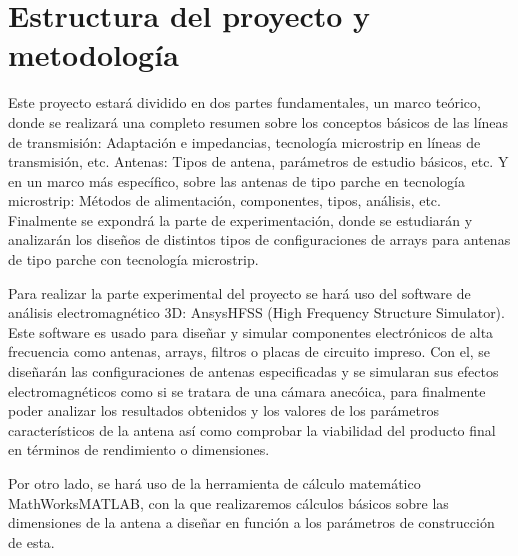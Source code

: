 \section{Estructura del proyecto y metodología}

\par Este proyecto estará dividido en dos partes fundamentales, un marco teórico, donde se realizará una completo resumen sobre los conceptos básicos de las líneas de transmisión: Adaptación e impedancias, tecnología microstrip en líneas de transmisión, etc. Antenas: Tipos de antena, parámetros de estudio básicos, etc. Y en un marco más específico, sobre las antenas de tipo parche en tecnología microstrip: Métodos de alimentación, componentes, tipos, análisis, etc. Finalmente se expondrá la parte de experimentación, donde se estudiarán y analizarán los diseños de distintos tipos de configuraciones de arrays para antenas de tipo parche con tecnología microstrip.
\\
\par Para realizar la parte experimental del proyecto se hará uso del software de análisis electromagnético 3D: Ansys\sffamily\textregistered  HFSS (High Frequency Structure Simulator). Este software es usado para diseñar y simular componentes electrónicos de alta frecuencia como antenas, arrays, filtros o placas de circuito impreso. Con el, se diseñarán las configuraciones de antenas especificadas y se simularan sus efectos electromagnéticos como si se tratara de una cámara anecóica, para finalmente poder analizar los resultados obtenidos y los valores de los parámetros característicos de la antena así como comprobar la viabilidad del producto final en términos de rendimiento o dimensiones.
\\
\par Por otro lado, se hará uso de la herramienta de cálculo matemático MathWorks\sffamily\textregistered  MATLAB, con la que realizaremos cálculos básicos sobre las dimensiones de la antena a diseñar en función a los parámetros de construcción de esta.

